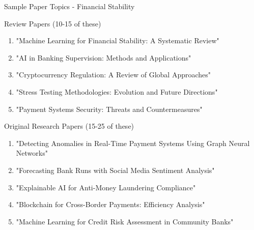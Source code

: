 \documentclass[11pt]{beamer}
\begin{document}
	\begin{frame}{Sample Paper Topics - Financial Stability}
		\scriptsize
		\begin{block}{Review Papers (10-15 of these)}
			\begin{enumerate}
				\item "Machine Learning for Financial Stability: A Systematic Review"
				\item "AI in Banking Supervision: Methods and Applications"
				\item "Cryptocurrency Regulation: A Review of Global Approaches"
				\item "Stress Testing Methodologies: Evolution and Future Directions"
				\item "Payment Systems Security: Threats and Countermeasures"
			\end{enumerate}
		\end{block}
		\begin{block}{Original Research Papers (15-25 of these)}
			\begin{enumerate}
				\item "Detecting Anomalies in Real-Time Payment Systems Using Graph Neural Networks"
				\item "Forecasting Bank Runs with Social Media Sentiment Analysis"
				\item "Explainable AI for Anti-Money Laundering Compliance"
				\item "Blockchain for Cross-Border Payments: Efficiency Analysis"
				\item "Machine Learning for Credit Risk Assessment in Community Banks"
			\end{enumerate}
		\end{block}
	\end{frame}
	
\end{document}
